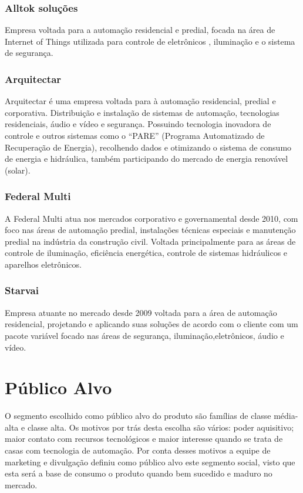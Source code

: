 \subsubsection{Alltok soluções}
\par Empresa voltada para a automação residencial e predial, focada na área de Internet of Things utilizada para controle de eletrônicos , iluminação e o sistema de segurança.

\subsubsection{Arquitectar}
\par Arquitectar é uma empresa voltada para à automação residencial, predial e corporativa. Distribuição e instalação de sistemas de automação, tecnologias residenciais, áudio e vídeo e segurança. Possuindo tecnologia inovadora de controle e outros sistemas como o “PARE” (Programa Automatizado de Recuperação de Energia), recolhendo dados e otimizando o sistema de consumo de energia e hidráulica, também participando do mercado de energia renovável (solar).

\subsubsection{Federal Multi}
\par A Federal Multi atua nos mercados corporativo e governamental desde 2010, com foco nas áreas de automação predial, instalações técnicas especiais e manutenção predial na indústria da construção civil. Voltada principalmente para as áreas de controle de iluminação, eficiência energética, controle de sistemas hidráulicos e aparelhos eletrônicos.

\subsubsection{Starvai}
\par Empresa atuante no mercado desde 2009 voltada para a área de automação residencial, projetando e aplicando suas soluções de acordo com o cliente com um pacote variável focado nas áreas de segurança, iluminação,eletrônicos, áudio e vídeo.

\section{Público Alvo}
\par O segmento escolhido como público alvo do produto são famílias de classe média-alta e classe alta. Os motivos por trás desta escolha são vários: poder aquisitivo; maior contato com recursos tecnológicos e maior interesse quando se trata de casas com tecnologia de automação. Por conta desses motivos a equipe de marketing e divulgação definiu como público alvo este segmento social, visto que esta será a base de consumo o produto quando bem sucedido e maduro no mercado.


